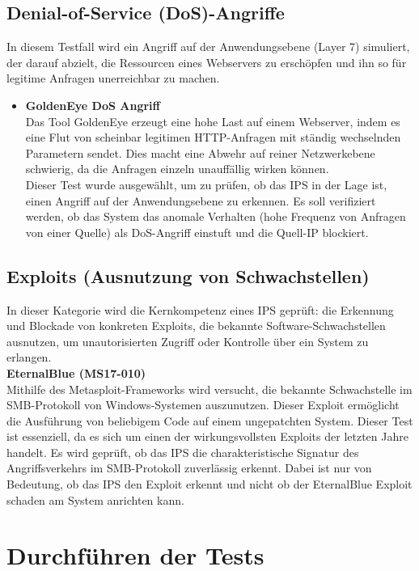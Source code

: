 \subsection{Denial-of-Service (DoS)-Angriffe}
In diesem Testfall wird ein Angriff auf der Anwendungsebene (Layer 7) simuliert, der darauf abzielt, die Ressourcen eines Webservers zu erschöpfen und ihn so für legitime Anfragen unerreichbar zu machen.\\
\begin{itemize}
\item \textbf{GoldenEye DoS Angriff}\\
 Das Tool GoldenEye erzeugt eine hohe Last auf einem Webserver, indem es eine Flut von scheinbar legitimen HTTP-Anfragen mit ständig wechselnden Parametern sendet. Dies macht eine Abwehr auf reiner Netzwerkebene schwierig, da die Anfragen einzeln unauffällig wirken können.\\
Dieser Test wurde ausgewählt, um zu prüfen, ob das IPS in der Lage ist, einen Angriff auf der Anwendungsebene zu erkennen. Es soll verifiziert werden, ob das System das anomale Verhalten (hohe Frequenz von Anfragen von einer Quelle) als DoS-Angriff einstuft und die Quell-IP blockiert.
\end{itemize}

\subsection{Exploits (Ausnutzung von Schwachstellen)}
In dieser Kategorie wird die Kernkompetenz eines IPS geprüft: die Erkennung und Blockade von konkreten Exploits, die bekannte Software-Schwachstellen ausnutzen, um unautorisierten Zugriff oder Kontrolle über ein System zu erlangen.\\

\textbf{EternalBlue (MS17-010)}\\
Mithilfe des Metasploit-Frameworks wird versucht, die bekannte Schwachstelle im SMB-Protokoll von Windows-Systemen auszunutzen. Dieser Exploit ermöglicht die Ausführung von beliebigem Code auf einem ungepatchten System.
Dieser Test ist essenziell, da es sich um einen der wirkungsvollsten Exploits der letzten Jahre handelt. Es wird geprüft, ob das IPS die charakteristische Signatur des Angriffsverkehrs im SMB-Protokoll zuverlässig erkennt. Dabei ist nur von Bedeutung, ob das IPS den Exploit erkennt und nicht ob der EternalBlue Exploit schaden am System anrichten kann.


\section{Durchführen der Tests}